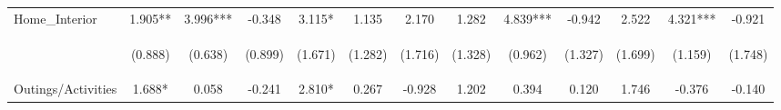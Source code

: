 \begin{tabular}{lcccccccccccc}
\noalign{\smallskip}Home_Interior & 1.905** & 3.996*** & -0.348 & 3.115* & 1.135 & 2.170 & 1.282 & 4.839*** & -0.942 & 2.522 & 4.321*** & -0.921\\
 & \begin{footnotesize}(0.888)\end{footnotesize} & \begin{footnotesize}(0.638)\end{footnotesize} & \begin{footnotesize}(0.899)\end{footnotesize} & \begin{footnotesize}(1.671)\end{footnotesize} & \begin{footnotesize}(1.282)\end{footnotesize} & \begin{footnotesize}(1.716)\end{footnotesize} & \begin{footnotesize}(1.328)\end{footnotesize} & \begin{footnotesize}(0.962)\end{footnotesize} & \begin{footnotesize}(1.327)\end{footnotesize} & \begin{footnotesize}(1.699)\end{footnotesize} & \begin{footnotesize}(1.159)\end{footnotesize} & \begin{footnotesize}(1.748)\end{footnotesize}\\
\noalign{\smallskip}Outings/Activities & 1.688* & 0.058 & -0.241 & 2.810* & 0.267 & -0.928 & 1.202 & 0.394 & 0.120 & 1.746 & -0.376 & -0.140\\

\end{tabular}

